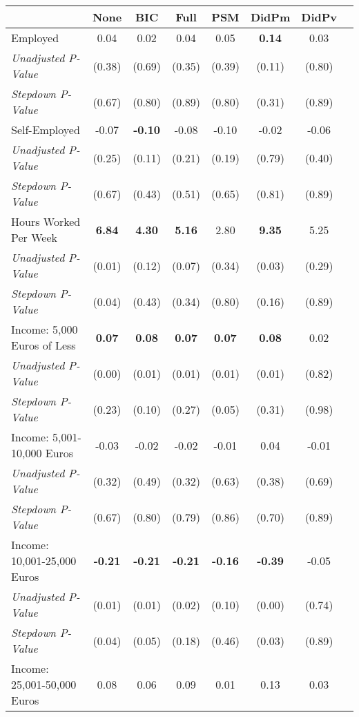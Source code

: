 \begin{tabular}{l c c c c c c c}
\toprule
 & None & BIC & Full & PSM & DidPm & DidPv \\
\midrule
Employed & 0.04 & 0.02 & 0.04 & 0.05 & \textbf{ 0.14 } & 0.03 \\
\quad \textit{Unadjusted P-Value} & (0.38) & (0.69) & (0.35) & (0.39) & (0.11) & (0.80) \\
\quad \textit{Stepdown P-Value} & (0.67) & (0.80) & (0.89) & (0.80) & (0.31) & (0.89) \\
Self-Employed & -0.07 & \textbf{ -0.10 } & -0.08 & -0.10 & -0.02 & -0.06 \\
\quad \textit{Unadjusted P-Value} & (0.25) & (0.11) & (0.21) & (0.19) & (0.79) & (0.40) \\
\quad \textit{Stepdown P-Value} & (0.67) & (0.43) & (0.51) & (0.65) & (0.81) & (0.89) \\
Hours Worked Per Week & \textbf{ 6.84 } & \textbf{ 4.30 } & \textbf{ 5.16 } & 2.80 & \textbf{ 9.35 } & 5.25 \\
\quad \textit{Unadjusted P-Value} & (0.01) & (0.12) & (0.07) & (0.34) & (0.03) & (0.29) \\
\quad \textit{Stepdown P-Value} & (0.04) & (0.43) & (0.34) & (0.80) & (0.16) & (0.89) \\
Income: 5,000 Euros of Less & \textbf{ 0.07 } & \textbf{ 0.08 } & \textbf{ 0.07 } & \textbf{ 0.07 } & \textbf{ 0.08 } & 0.02 \\
\quad \textit{Unadjusted P-Value} & (0.00) & (0.01) & (0.01) & (0.01) & (0.01) & (0.82) \\
\quad \textit{Stepdown P-Value} & (0.23) & (0.10) & (0.27) & (0.05) & (0.31) & (0.98) \\
Income: 5,001-10,000 Euros & -0.03 & -0.02 & -0.02 & -0.01 & 0.04 & -0.01 \\
\quad \textit{Unadjusted P-Value} & (0.32) & (0.49) & (0.32) & (0.63) & (0.38) & (0.69) \\
\quad \textit{Stepdown P-Value} & (0.67) & (0.80) & (0.79) & (0.86) & (0.70) & (0.89) \\
Income: 10,001-25,000 Euros & \textbf{ -0.21 } & \textbf{ -0.21 } & \textbf{ -0.21 } & \textbf{ -0.16 } & \textbf{ -0.39 } & -0.05 \\
\quad \textit{Unadjusted P-Value} & (0.01) & (0.01) & (0.02) & (0.10) & (0.00) & (0.74) \\
\quad \textit{Stepdown P-Value} & (0.04) & (0.05) & (0.18) & (0.46) & (0.03) & (0.89) \\
Income: 25,001-50,000 Euros & 0.08 & 0.06 & 0.09 & 0.01 & 0.13 & 0.03 \\

\end{tabular}
